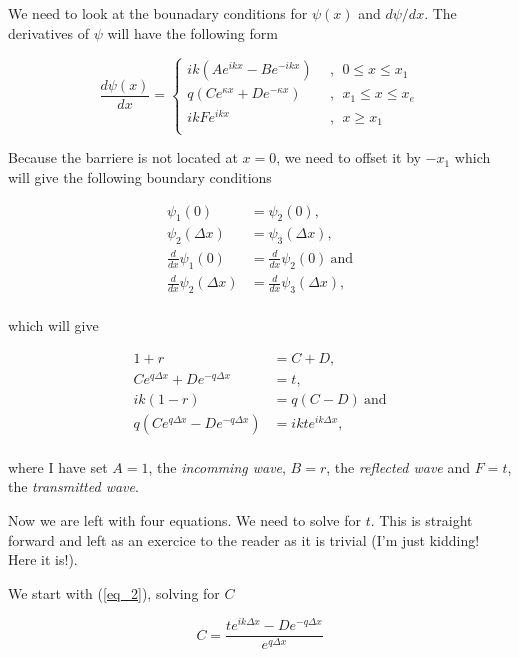 \documentclass{article}
\begin{document}
We need to look at the bounadary conditions for $\psi(x)$ and $d\psi/dx$. The derivatives of $\psi$ will have the following form

\begin{equation}
\frac{d\psi(x)}{dx} = \begin{cases}
ik(Ae^{ikx} - Be^{-ikx}) \ \ &, \ \ 0 \leq x \leq x_1 \\
q(Ce^{\kappa x} + De^{-\kappa x}) \ \ &, \ \ x_1 \leq x \leq x_e \\
ikFe^{ikx}  &, \ \ x \geq x_1 \\
\end{cases}
\end{equation}

Because the barriere is not located at $x=0$, we need to offset it by $-x_1$ which will give the following boundary conditions

\begin{align}
\psi_1(0) &= \psi_2(0), \\
\psi_2(\Delta x) &= \psi_3(\Delta x),\\
\frac{d}{dx}\psi_1(0) &= \frac{d}{dx}\psi_2(0) \ \text{and} \\
\frac{d}{dx}\psi_2(\Delta x) &= \frac{d}{dx}\psi_3(\Delta x), \\
\end{align}

which will give

\begin{align}
1 + r &= C + D, \label{eq_1} \\
Ce^{q\Delta x} + De^{-q\Delta x} &= t, \label{eq_2} \\
ik(1-r) &= q(C - D) \ \text{and} \label{eq_3} \\
q(Ce^{q\Delta x} - De^{-q\Delta x}) &= ikte^{ik\Delta x}, \label{eq_4} \\
\end{align}

where I have set $A = 1$, the \textit{incomming wave}, $B = r$, the \textit{reflected wave} and  $F = t$, the \textit{transmitted wave}.

Now we are left with four equations. We need to solve for $t$. This is straight forward and left as an exercice to the reader as it is trivial (I'm just kidding! Here it is!).

We start with (\ref{eq_2}), solving for $C$

\begin{equation}
C = \frac{te^{ik\Delta x}-De^{-q\Delta x}}{e^{q\Delta x}} \label{eq_5}
\end{equation}
\end{document}
